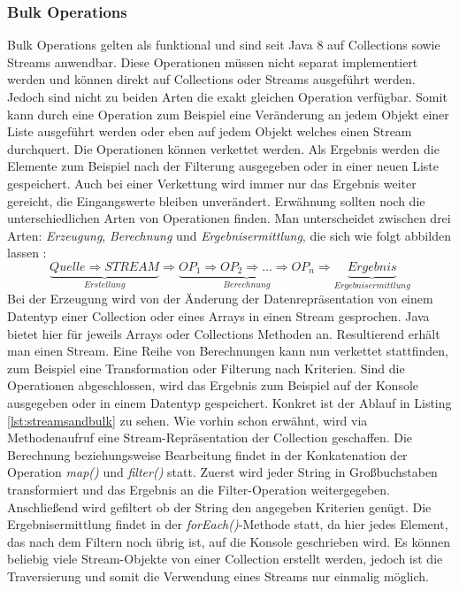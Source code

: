 \subsubsection{Bulk Operations}
Bulk Operations gelten als funktional und sind seit Java 8 auf Collections sowie Streams anwendbar. Diese Operationen müssen nicht separat implementiert werden und können direkt auf Collections oder Streams ausgeführt werden. Jedoch sind nicht zu beiden Arten die exakt gleichen Operation verfügbar. Somit kann durch eine Operation zum Beispiel eine Veränderung an jedem Objekt einer Liste ausgeführt werden oder eben auf jedem Objekt welches einen Stream durchquert. Die Operationen können verkettet werden. Als Ergebnis werden die Elemente zum Beispiel nach der Filterung ausgegeben oder in einer neuen Liste gespeichert. Auch bei einer Verkettung wird immer nur das Ergebnis weiter gereicht, die Eingangswerte bleiben unverändert. Erwähnung sollten noch die unterschiedlichen Arten von Operationen finden. Man unterscheidet zwischen drei Arten: \textit{Erzeugung}, \textit{Berechnung} und \textit{Ergebnisermittlung}, die sich wie folgt abbilden lassen \cite{Inden.2015} : 
\begin{displaymath}
\underbrace{Quelle \Rightarrow STREAM}_{Erstellung} \Rightarrow \underbrace{OP_{1} \Rightarrow OP_{2} \Rightarrow ... \Rightarrow OP_{n}}_{Berechnung} \Rightarrow \underbrace{Ergebnis}_{Ergebnisermittlung}
\end{displaymath}
Bei der Erzeugung wird von der Änderung der Datenrepräsentation von einem Datentyp einer Collection oder eines Arrays in einen Stream gesprochen. Java bietet hier für jeweils Arrays oder Collections Methoden an. Resultierend erhält man einen Stream. Eine Reihe von Berechnungen kann nun verkettet stattfinden, zum Beispiel eine Transformation oder Filterung nach Kriterien. Sind die Operationen abgeschlossen, wird das Ergebnis zum Beispiel auf der Konsole ausgegeben oder in einem Datentyp gespeichert. Konkret ist der Ablauf in Listing \ref{lst:streamsandbulk} zu sehen. Wie vorhin schon erwähnt, wird via Methodenaufruf eine Stream-Repräsentation der Collection geschaffen. Die Berechnung beziehungsweise Bearbeitung findet in der Konkatenation der Operation \textit{map()} und \textit{filter()} statt. Zuerst wird jeder String in Großbuchstaben transformiert und das Ergebnis an die Filter-Operation weitergegeben. Anschließend wird gefiltert ob der String den angegeben Kriterien genügt. Die Ergebnisermittlung findet in der \textit{forEach()}-Methode statt, da hier jedes Element, das nach dem Filtern noch übrig ist, auf die Konsole geschrieben wird. Es können beliebig viele Stream-Objekte von einer Collection erstellt werden, jedoch ist die Traversierung und somit die Verwendung eines Streams nur einmalig möglich.
